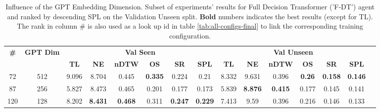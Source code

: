 \begin{table}
\centering
\caption{\label{tab:f_dt_dim_test}Influence of the GPT Embedding Dimension. Subset of experiments' results for Full Decision Transformer ('F-DT') agent and ranked by descending SPL on the Validation Unseen split. \textbf{Bold} numbers indicates the best results (except for TL). The rank in column \# is also used as a look up id in table \ref{tab:all-configs-final} to link the corresponding training configuration.}
\begin{tabular}{@{\hskip3pt}c@{\hskip3pt}c@{\hskip3pt}c@{\hskip3pt}c@{\hskip3pt}c@{\hskip3pt}c@{\hskip3pt}c@{\hskip3pt}c@{\hskip3pt}c@{\hskip3pt}c@{\hskip3pt}c@{\hskip3pt}c@{\hskip3pt}c@{\hskip3pt}c@{\hskip3pt}c}
\toprule
                                  \textbf{\#} & \textbf{GPT Dim} & \multicolumn{6}{c}{\textbf{Val Seen}} & \multicolumn{6}{c}{\textbf{Val Unseen}} \\
\cmidrule(l){3-8}\cmidrule(l){9-14}\textbf{~} &       \textbf{~} &       \textbf{TL} &     \textbf{NE} &   \textbf{nDTW} &     \textbf{OS} &     \textbf{SR} &    \textbf{SPL} &         \textbf{TL} &     \textbf{NE} &   \textbf{nDTW} &    \textbf{OS} &     \textbf{SR} &    \textbf{SPL} \\
\midrule
                                           72 &              512 &             9.096 &           8.704 &           0.445 &  \textbf{0.335} &           0.224 &            0.21 &               8.332 &           9.631 &           0.396 &  \textbf{0.26} &  \textbf{0.158} &  \textbf{0.146} \\
                                           87 &              256 &             5.827 &           8.473 &           0.465 &           0.201 &           0.177 &           0.173 &               5.839 &  \textbf{8.876} &  \textbf{0.415} &          0.177 &           0.145 &           0.141 \\
                                          120 &              128 &             8.202 &  \textbf{8.431} &  \textbf{0.468} &           0.311 &  \textbf{0.247} &  \textbf{0.229} &               7.413 &            9.59 &           0.396 &          0.216 &           0.146 &           0.133 \\
\bottomrule
\end{tabular}
\end{table}
